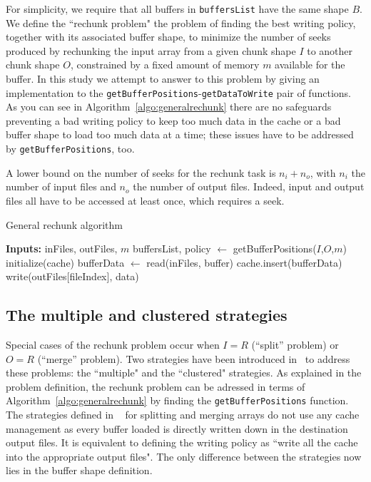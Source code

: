 \documentclass[conference]{IEEEtran}
\begin{document}
For simplicity, we require that all buffers in \texttt{buffersList} have
the same shape $B$. We define the ``rechunk problem" the problem of finding the
best writing policy, together with its associated buffer shape, to minimize the
number of seeks produced by rechunking the input array from a given chunk shape
$I$ to another chunk shape $O$, constrained by a fixed amount of memory $m$
available for the buffer. In this study we attempt to answer to this problem by
giving an implementation to the \texttt{getBufferPositions}-\texttt{getDataToWrite}
pair of functions. As you can see in Algorithm~\ref{algo:generalrechunk} there
are no safeguards preventing a bad writing policy to keep too much data in the
cache or a bad buffer shape to load too much data at a time; these issues have
to be addressed by \texttt{getBufferPositions}, too.

A lower bound on the number of seeks for the rechunk task is
$n_i + n_o$, with $n_i$ the number of input files and $n_o$ the number of output
files. Indeed, input and output files all have to be accessed at least once,
which requires a seek.

\begin{algorithm}
  \caption{General rechunk algorithm}
  \label{algo:generalrechunk}
  \begin{algorithmic}[1]
    \STATE \textbf{Inputs:} inFiles, outFiles, $m$
    \STATE buffersList, policy $\leftarrow$ getBufferPositions($I$,$O$,$m$)
    \STATE initialize(cache)
      \STATE bufferData $\leftarrow$ read(inFiles, buffer)
      \STATE cache.insert(bufferData)
        \STATE write(outFiles[fileIndex], data)
      \ENDFOR
    \ENDFOR

  \end{algorithmic}
\end{algorithm}

\subsection{The multiple and clustered strategies}
Special cases of the rechunk problem occur when $I=R$ (``split'' problem)
or $O=R$ (``merge'' problem). Two strategies have been introduced
in~\cite{seqalgorithms} to address these problems: the ``multiple" and the
``clustered" strategies. As explained in the problem definition, the rechunk
problem can be adressed in terms of Algorithm~\ref{algo:generalrechunk}
by finding the \texttt{getBufferPositions} function.
The strategies defined in ~\cite{seqalgorithms} for splitting and merging arrays
do not use any cache management as every buffer loaded is directly written down
in the destination output files. It is equivalent to defining the writing policy
as ``write all the cache into the appropriate output files". The only difference
between the strategies now lies in the buffer shape definition.
\end{document}
